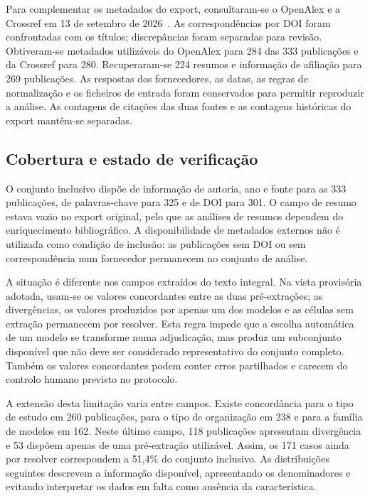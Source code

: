 Para complementar os metadados do export, consultaram-se o OpenAlex
e a Crossref em 13 de setembro de 2026~\cite{Priem2022OpenAlex,Crossref2026API}.
As correspondências por DOI foram confrontadas com os títulos;
discrepâncias foram separadas para revisão. Obtiveram-se metadados
utilizáveis do OpenAlex para 284 das 333 publicações e da Crossref
para 280. Recuperaram-se 224 resumos e informação de afiliação para
269 publicações. As respostas dos fornecedores, as datas, as regras
de normalização e os ficheiros de entrada foram conservados para
permitir reproduzir a análise. As contagens de citações das duas
fontes e as contagens históricas do export mantêm-se separadas.

\subsection{Cobertura e estado de verificação}

O conjunto inclusivo dispõe de informação de autoria, ano e fonte
para as 333 publicações, de palavras-chave para 325 e de DOI para 301.
O campo de resumo estava vazio no export original, pelo que as
análises de resumos dependem do enriquecimento bibliográfico.
A disponibilidade de metadados externos não é utilizada como condição
de inclusão: as publicações sem DOI ou sem correspondência num
fornecedor permanecem no conjunto de análise.

A situação é diferente nos campos extraídos do texto integral.
Na vista provisória adotada, usam-se os valores concordantes entre
as duas pré-extrações; as divergências, os valores produzidos por
apenas um dos modelos e as células sem extração permanecem por
resolver. Esta regra impede que a escolha automática de um modelo
se transforme numa adjudicação, mas produz um subconjunto disponível
que não deve ser considerado representativo do conjunto completo.
Também os valores concordantes podem conter erros partilhados e
carecem do controlo humano previsto no protocolo.

A extensão desta limitação varia entre campos. Existe concordância
para o tipo de estudo em 260 publicações, para o tipo de organização
em 238 e para a família de modelos em 162. Neste último campo,
118 publicações apresentam divergência e 53 dispõem apenas de uma
pré-extração utilizável. Assim, os 171 casos ainda por resolver
correspondem a 51,4\% do conjunto inclusivo. As distribuições seguintes
descrevem a informação disponível, apresentando os denominadores e
evitando interpretar os dados em falta como ausência da característica.

